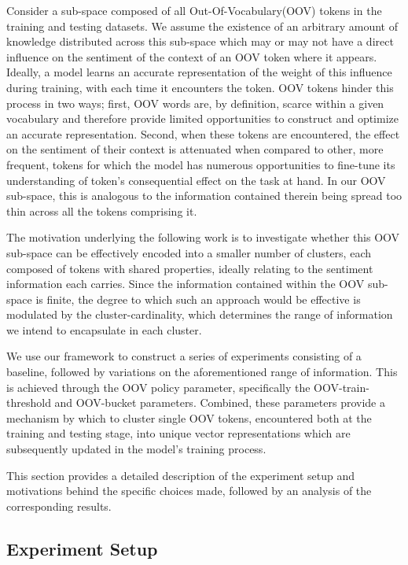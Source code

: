 \documentclass[../../fyp.tex]{subfiles}
\begin{document}
Consider a sub-space composed of all Out-Of-Vocabulary(OOV) tokens in the training and testing datasets. We assume the existence of an arbitrary amount of knowledge distributed across this sub-space which may or may not have a direct influence on the sentiment of the context of an OOV token where it appears. Ideally, a model learns an accurate representation of the weight of this influence during training, with each time it encounters the token. OOV tokens hinder this process in two ways; first, OOV words are, by definition, scarce within a given vocabulary and therefore provide limited opportunities to construct and optimize an accurate representation. Second, when these tokens are encountered, the effect on the sentiment of their context is attenuated when compared to other, more frequent, tokens for which the model has numerous opportunities to fine-tune its understanding of token's consequential effect on the task at hand. In our OOV sub-space, this is analogous to the information contained therein being spread too thin across all the tokens comprising it. 

The motivation underlying the following work is to investigate whether this OOV sub-space can be effectively encoded into a smaller number of clusters, each composed of tokens with shared properties, ideally relating to the sentiment information each carries. Since the information contained within the OOV sub-space is finite, the degree to which such an approach would be effective is modulated by the cluster-cardinality, which determines the range of information we intend to encapsulate in each cluster.

We use our framework to construct a series of experiments consisting of a baseline, followed by variations on the aforementioned range of information. This is achieved through the OOV policy parameter, specifically the OOV-train-threshold and OOV-bucket parameters. Combined, these parameters provide a mechanism by which to cluster single OOV tokens, encountered both at the training and testing stage, into unique vector representations which are subsequently updated in the model's training process. 

This section provides a detailed description of the experiment setup and motivations behind the specific choices made, followed by an analysis of the corresponding results.

\subsection{Experiment Setup}
\end{document}
